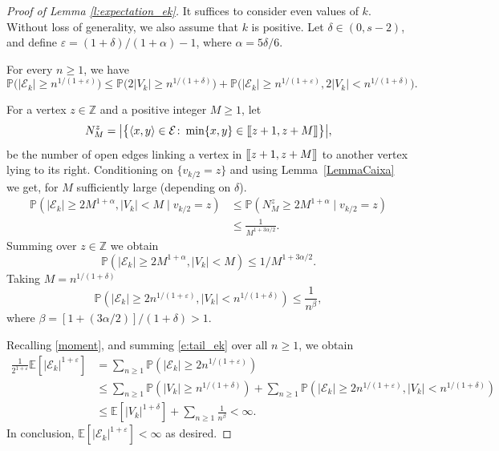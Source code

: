 \documentclass[a4paper,oneside,12pt]{amsart}
\def\llbracket{[\hspace{-.10em} [ }
\def\rrbracket{ ] \hspace{-.10em}]}
\renewcommand{\leq}{\leqslant}
\renewcommand{\geq}{\geqslant}
\newcommand{\E}{\mathbb{E}}
\theoremstyle{plain}
\theoremstyle{definition}
\theoremstyle{remark}
\newcommand{\Z}{{\mathbb{Z}}}
\renewcommand{\P}{\mathbb{P}}
\begin{document}
\begin{proof}[Proof of Lemma \ref{l:expectation_ek}]
It suffices to consider even values of $k$. Without loss of generality, we also assume that $k$ is positive.
Let $\delta \in (0,s-2)$, and define $\varepsilon = (1+\delta)/(1+\alpha)-1$, where $\alpha = 5\delta/6$.

For every $n \geq 1$, we have
\begin{equation}
\label{e:tail_ek}
\P  \Big(  |\mathcal{E}_k| \geq n^{1/(1+\varepsilon)}\Big) %
\leq \P\Big( 2|V_k| \geq n^{1/(1+\delta)}  \Big) + \P\Big(  |\mathcal{E}_k| \geq n^{1/(1+\varepsilon)}, 2|V_k| < n^{1/(1+\delta)}  \Big).
\end{equation}

For a vertex $z \in \Z$ and a positive integer $M \geq 1$, let 
\[
N_M^z = \big\vert \big\{\langle x,y \rangle \in \mathcal{E}  \colon \min\{x,y\} \in \llbracket z+1,z+M \rrbracket \big\} \big\vert,
\]
be the number of open edges linking a vertex in $\llbracket z+1,z+M \rrbracket$ to another vertex lying to its right.
Conditioning on $\{ v_{k/2} = z\}$ and using  Lemma~\ref{LemmaCaixa} we get, for $M$ sufficiently large (depending on $\delta$).
\begin{equation}
\begin{split}
\P\left( |\mathcal{E}_k| \geq 2M^{1+\alpha}, |V_k| < M \mid v_{k/2} = z \right) 
& \leq \P \left( N_{M}^z \geq 2M^{1+\alpha} \mid v_{k/2} = z \right) \\
& \leq \frac{1}{M^{1+3 \alpha/2}}.
\end{split}
\end{equation}
Summing over $z \in \mathbb{Z}$ we obtain 
\[
\P\left(|\mathcal{E}_k| \geq 2M^{1+ \alpha}, |V_k| < M \right) \leq 1/M^{1+3\alpha/2}.
\]
Taking $M = n^{1/(1+\delta)}$
\begin{equation*}
\P\left(  |\mathcal{E}_k| \geq  2 n^{1/(1+\varepsilon)}, |V_k| < n^{1/(1+\delta)}  \right) \leq \frac{1}{n^{\beta}},
\end{equation*}
where $\beta = [1+(3\alpha/2)]/(1+\delta) > 1$.

Recalling \eqref{moment}, and summing \eqref{e:tail_ek} over all $n \geq 1$, we obtain
\begin{align*} 
\frac{1}{2^{1+\varepsilon}}\E[|\mathcal{E}_k|^{1+\varepsilon}]  &= \sum_{n \geq 1} \P\left( |\mathcal{E}_k| \geq 2 n^{1/(1+\varepsilon)}\right) \\ 
&\leq  \sum_{n \geq 1} \P\left( |V_k| \geq n^{1/(1+\delta)} \right) + \sum_{n \geq 1} \P\left(  |\mathcal{E}_k| \geq  2 n^{1/(1+\varepsilon)}, |V_k| < n^{1/(1+\delta)}  \right) \\
&\leq \E[|V_k|^{1+\delta}] + \sum_{n \geq 1} \frac{1}{n^{\beta}} < \infty.
\end{align*}
In conclusion, $\E[|\mathcal{E}_k|^{1+\varepsilon}] < \infty$ as desired.
\end{proof}
\end{document}
